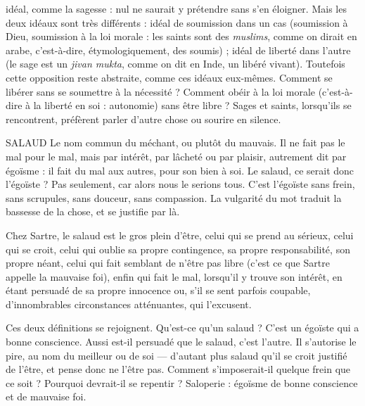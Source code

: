 idéal, comme la sagesse : nul ne saurait y prétendre sans s’en éloigner. Mais les
deux idéaux sont très différents : idéal de soumission dans un cas (soumission à
Dieu, soumission à la loi morale : les saints sont des {\it muslims}, comme on dirait
en arabe, c’est-à-dire, étymologiquement, des soumis) ; idéal de liberté dans
l’autre (le sage est un {\it jivan mukta}, comme on dit en Inde, un libéré vivant).
Toutefois cette opposition reste abstraite, comme ces idéaux eux-mêmes. Comment
se libérer sans se soumettre à la nécessité ? Comment obéir à la loi morale
(c’est-à-dire à la liberté en soi : autonomie) sans être libre ? Sages et saints,
lorsqu'ils se rencontrent, préfèrent parler d’autre chose ou sourire en silence.

SALAUD Le nom commun du méchant, ou plutôt du mauvais. Il ne fait pas
le mal pour le mal, mais par intérêt, par lâcheté ou par plaisir,
autrement dit par égoïsme : il fait du mal aux autres, pour son bien à soi. Le
salaud, ce serait donc l’égoïste ? Pas seulement, car alors nous le serions tous.
C’est l’égoïste sans frein, sans scrupules, sans douceur, sans compassion. La vulgarité
du mot traduit la bassesse de la chose, et se justifie par là.

Chez Sartre, le salaud est le gros plein d’être, celui qui se prend au sérieux,
celui qui se croit, celui qui oublie sa propre contingence, sa propre responsabilité,
son propre néant, celui qui fait semblant de n’être pas libre (c’est ce que
Sartre appelle la mauvaise foi), enfin qui fait le mal, lorsqu'il y trouve son
intérêt, en étant persuadé de sa propre innocence ou, s’il se sent parfois coupable,
d’innombrables circonstances atténuantes, qui l’excusent.

Ces deux définitions se rejoignent. Qu'est-ce qu’un salaud ? C’est un égoïste
qui a bonne conscience. Aussi est-il persuadé que le salaud, c’est l’autre. Il
s’autorise le pire, au nom du meilleur ou de soi — d’autant plus salaud qu’il se
croit justifié de l’être, et pense donc ne l'être pas. Comment s’imposerait-il
quelque frein que ce soit ? Pourquoi devrait-il se repentir ? Saloperie : égoïsme
de bonne conscience et de mauvaise foi.

